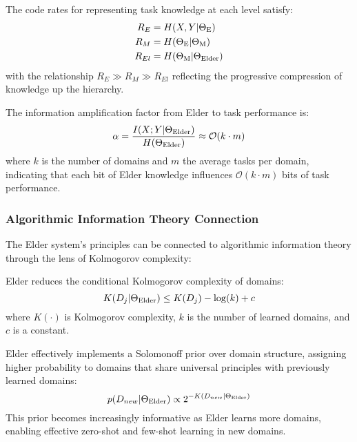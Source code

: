 \begin{proposition}
The code rates for representing task knowledge at each level satisfy:
\begin{align}
R_E &= H(X, Y | \Theta_{\text{E}}) \\
R_M &= H(\Theta_{\text{E}} | \Theta_{\text{M}}) \\
R_{El} &= H(\Theta_{\text{M}} | \Theta_{\text{Elder}})
\end{align}
with the relationship $R_E \gg R_M \gg R_{El}$ reflecting the progressive compression of knowledge up the hierarchy.
\end{proposition}

\begin{corollary}
The information amplification factor from Elder to task performance is:
\begin{equation}
\alpha = \frac{I(X; Y | \Theta_{\text{Elder}})}{H(\Theta_{\text{Elder}})} \approx \mathcal{O}(k \cdot m)
\end{equation}
where $k$ is the number of domains and $m$ the average tasks per domain, indicating that each bit of Elder knowledge influences $\mathcal{O}(k \cdot m)$ bits of task performance.
\end{corollary}

\subsubsection{Algorithmic Information Theory Connection}

The Elder system's principles can be connected to algorithmic information theory through the lens of Kolmogorov complexity:

\begin{theorem}
Elder reduces the conditional Kolmogorov complexity of domains:
\begin{equation}
K(D_j | \Theta_{\text{Elder}}) \leq K(D_j) - \log(k) + c
\end{equation}
where $K(\cdot)$ is Kolmogorov complexity, $k$ is the number of learned domains, and $c$ is a constant.
\end{theorem}

\begin{proposition}
Elder effectively implements a Solomonoff prior over domain structure, assigning higher probability to domains that share universal principles with previously learned domains:
\begin{equation}
p(D_{new} | \Theta_{\text{Elder}}) \propto 2^{-K(D_{new} | \Theta_{\text{Elder}})}
\end{equation}
This prior becomes increasingly informative as Elder learns more domains, enabling effective zero-shot and few-shot learning in new domains.
\end{proposition}

